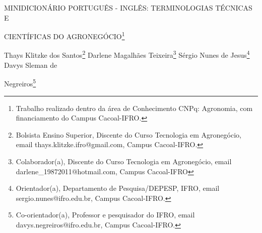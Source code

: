\documentclass[article,12pt,onesidea,4paper,english,brazil]{abntex2}
\begin{document}
	
	
	\frenchspacing 
	
	\begin{center}
		\LARGE MINIDICIONÁRIO PORTUGUÊS - INGLÊS: TERMINOLOGIAS TÉCNICAS E
		
		CIENTÍFICAS DO AGRONEGÓCIO\footnote{Trabalho realizado dentro da área de Conhecimento CNPq: Agronomia, com financiamento do
			Campus Cacoal-IFRO.}
		
		\normalsize
		Thays Klitzke dos Santos\footnote{Bolsista Ensino Superior, Discente do Curso Tecnologia em Agronegócio, email
			thays.klitzke.ifro@gmail.com, Campus Cacoal-IFRO.} 
		Darlene Magalhães Teixeira\footnote{Colaborador(a), Discente do Curso Tecnologia em Agronegócio, email
			darlene\_19872011@hotmail.com, Campus Cacoal-IFRO} 
		Sérgio Nunes de Jesus\footnote{Orientador(a), Departamento de Pesquisa/DEPESP, IFRO, email sergio.nunes@ifro.edu.br, Campus
			Cacoal-IFRO.} 
		Davys Sleman de
		
		Negreiros\footnote{Co-orientador(a), Professor e pesquisador do IFRO, email davys.negreiros@ifro.edu.br, Campus
			Cacoal-IFRO.} 
	\end{center}
	
\end{document}
